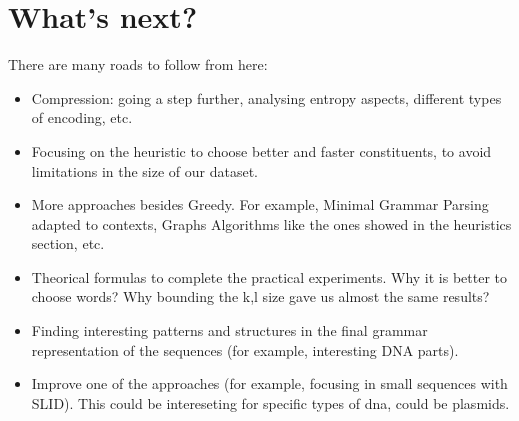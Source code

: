 \chapter{What's next?}

There are many roads to follow from here: 
\begin{itemize}
	\item Compression: going a step further, analysing entropy aspects, different 
	types of encoding, etc.
	
	\item Focusing on the heuristic to choose better and faster constituents, to avoid 
	limitations in the size of our dataset.

	\item More approaches besides Greedy. For example, Minimal Grammar Parsing adapted
	to contexts, Graphs Algorithms like the ones showed in the heuristics section, etc.

	\item Theorical formulas to complete the practical experiments. Why it is better 
	to choose words? Why bounding the k,l size gave us almost the same results?

	\item Finding interesting patterns and structures in the final grammar representation
	of the sequences (for example, interesting DNA parts).


	\item Improve one of the approaches (for example, focusing in small sequences with SLID). 
	This could be intereseting for specific types of dna, could be plasmids.
\end{itemize}